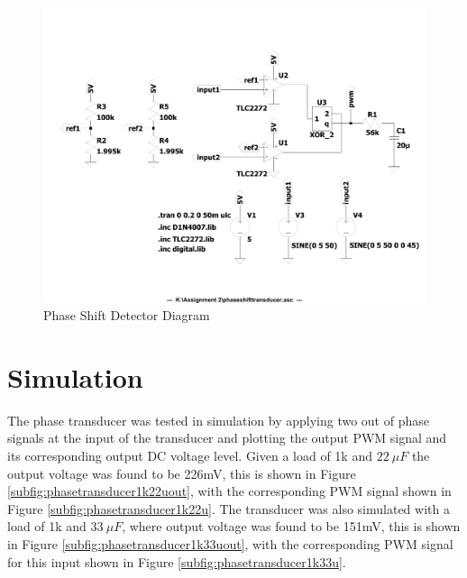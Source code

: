 \begin{figure}[h!]
    \centering
    \includegraphics[width = 0.65\linewidth]{Figures/phaseshifttransducer.pdf}
        \caption{Phase Shift Detector Diagram}
    \label{fig:phaseshiftdetector.pdf}
\end{figure}

\section{Simulation} \label{sec:simulation_phasetransducer}
The phase transducer was tested in simulation by applying two out of phase signals at the input of the transducer and plotting the output PWM signal and its corresponding output DC voltage level. Given a load of 1k and $\SI{22}{\mu F}$ the output voltage was found to be 226mV, this is shown in Figure \ref{subfig:phasetransducer1k22uout}, with the corresponding PWM signal shown in Figure \ref{subfig:phasetransducer1k22u}. The transducer was also simulated with a load of 1k and $\SI{33}{\mu F}$, where output voltage was found to be 151mV, this is shown in Figure \ref{subfig:phasetransducer1k33uout}, with the corresponding PWM signal for this input shown in Figure \ref{subfig:phasetransducer1k33u}. 

